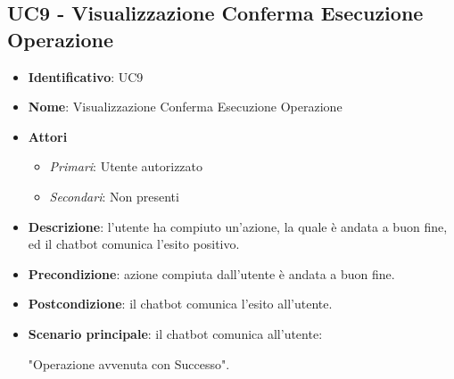 \subsection{UC9 - Visualizzazione Conferma Esecuzione Operazione}
\begin{itemize}
	\item \textbf{Identificativo}: UC9
	\item \textbf{Nome}: Visualizzazione Conferma Esecuzione Operazione
	\item \textbf{Attori}
	\begin{itemize} 
		\item \textit{Primari}: Utente autorizzato
	    \item \textit{Secondari}: Non presenti
	\end{itemize}
	\item \textbf{Descrizione}: l'utente ha compiuto un'azione, la quale è andata a buon fine, ed il chatbot comunica l'esito positivo.
	\item \textbf{Precondizione}: azione compiuta dall'utente è andata a buon fine.
	\item \textbf{Postcondizione}: il chatbot comunica l'esito all'utente.
	\item \textbf{Scenario principale}: il chatbot comunica all'utente: \begin{center}
		"Operazione avvenuta con Successo".
	\end{center}
\end{itemize}


